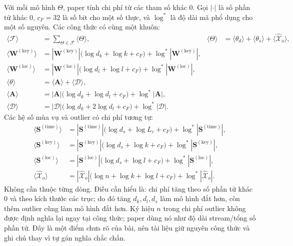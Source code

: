 Với mỗi mô hình $\Theta$, paper tính chi phí từ các tham số khác 0. Gọi $|\cdot|$ là số phần tử
khác 0, $c_F=32$ là số bit cho một số thực, và $\log^*$ là độ dài mã phổ dụng cho một số nguyên.
Các công thức có cùng một khuôn:
\begin{align}
  \bigl\langle\mathcal{F}\bigr\rangle
  &=\sum_{\Theta\in\mathcal{F}}\bigl\langle\Theta\bigr\rangle,
  &
  \bigl\langle\Theta\bigr\rangle
  &=\bigl\langle\theta_d\bigr\rangle
   +\bigl\langle\theta_s\bigr\rangle
   +\bigl\langle\widehat{\mathcal{X}}_o\bigr\rangle,
  \label{eq:model-cost}\\
  \bigl\langle\mathbf{W}^{(\mathrm{key})}\bigr\rangle
  &=|\mathbf{W}^{(\mathrm{key})}|
    \bigl(\log d_k+\log k+c_F\bigr)
    +\log^*|\mathbf{W}^{(\mathrm{key})}|,
  \label{eq:cost-wkey}\\
  \bigl\langle\mathbf{W}^{(\mathrm{loc})}\bigr\rangle
  &=|\mathbf{W}^{(\mathrm{loc})}|
    \bigl(\log d_l+\log l+c_F\bigr)
    +\log^*|\mathbf{W}^{(\mathrm{loc})}|,\\
  \bigl\langle\theta\bigr\rangle
  &=\bigl\langle\mathbf{A}\bigr\rangle
   +\bigl\langle\mathcal{D}\bigr\rangle,\\
  \bigl\langle\mathbf{A}\bigr\rangle
  &=|\mathbf{A}|\bigl(\log d_k+\log d_l+c_F\bigr)
    +\log^*|\mathbf{A}|,\\
  \bigl\langle\mathcal{D}\bigr\rangle
  &=|\mathcal{D}|\bigl(\log d_k+2\log d_l+c_F\bigr)
    +\log^*|\mathcal{D}|.
  \label{eq:cost-theta}
\end{align}
Các hệ số mùa vụ và outlier có chi phí tương tự:
\begin{align}
  \bigl\langle\mathbf{S}^{(\mathrm{time})}\bigr\rangle
  &=|\mathbf{S}^{(\mathrm{time})}|
    \bigl(\log d_s+\log L_c+c_F\bigr)
    +\log^*|\mathbf{S}^{(\mathrm{time})}|,\\
  \bigl\langle\mathbf{S}^{(\mathrm{key})}\bigr\rangle
  &=|\mathbf{S}^{(\mathrm{key})}|
    \bigl(\log d_s+\log k+c_F\bigr)
    +\log^*|\mathbf{S}^{(\mathrm{key})}|,\\
  \bigl\langle\mathbf{S}^{(\mathrm{loc})}\bigr\rangle
  &=|\mathbf{S}^{(\mathrm{loc})}|
    \bigl(\log d_s+\log l+c_F\bigr)
    +\log^*|\mathbf{S}^{(\mathrm{loc})}|,\\
  \bigl\langle\widehat{\mathcal{X}}_o\bigr\rangle
  &=|\widehat{\mathcal{X}}_o|
    \bigl(\log n+\log k+\log l+c_F\bigr)
    +\log^*|\widehat{\mathcal{X}}_o|.
  \label{eq:cost-outlier}
\end{align}
Không cần thuộc từng dòng. Điều cần hiểu là: chi phí tăng theo số phần tử khác 0 và theo kích
thước các trục; do đó tăng $d_k,d_l,d_s$ làm mô hình đắt hơn, còn thêm outlier cũng làm mô hình
đắt hơn. Ký hiệu $n$ trong chi phí outlier không được định nghĩa lại ngay tại công thức; paper dùng
nó như độ dài stream/tổng số phần tử. Đây là một điểm chưa rõ của bài, nên tài liệu giữ nguyên
công thức và ghi chú thay vì tự gán nghĩa chắc chắn.

